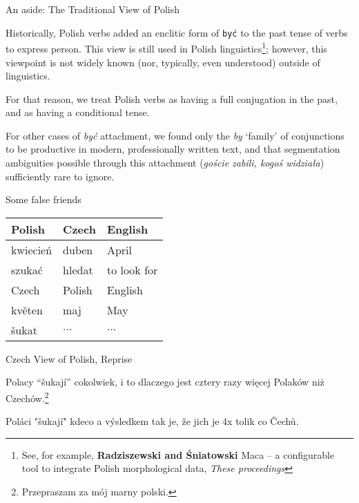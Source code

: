 \documentclass{beamer}
\begin{document}
\begin{frame}{An aside: The Traditional View of Polish}

Historically, Polish verbs added an enclitic form of {\tt by\'{c}} 
to the past tense of verbs to express person. This view is still
used in Polish linguistics\footnote{See, for example, \textbf{Radziszewski and \'{S}niatowski} 
Maca -- a configurable tool to integrate Polish morphological data, \textit{These proceedings}}; 
however, this viewpoint is not widely known (nor, typically, even understood) outside of linguistics.

For that reason, we treat Polish verbs as having a full conjugation in
the past, and as having a conditional tense. 

For other cases of {\it by\'{c}} attachment, we found only the {\it by} `family'
of conjunctions to be productive in modern, professionally written text, and 
that segmentation ambiguities possible through this attachment ({\it goście zabili, kogoś widziała}) 
sufficiently rare to ignore.

\end{frame}

\begin{frame}{Some false friends}
\begin{center}
    \begin{tabular}{ | l | l | l |}
    \hline
     Polish & Czech & English \\ 
     \hline
     kwiecie\'{n} & duben & April \\
     szuka\'{c} & hledat & to look for \\    
     \hline
     Czech & Polish & English \\ 
     \hline
     květen & maj & May \\
     \v{s}ukat & $\dots$ & $\dots$ \\
    \hline
    \end{tabular}
\end{center}
\end{frame}

\begin{frame}{Czech View of Polish, Reprise}

Polacy ``šukají'' cokolwiek, i to dlaczego jest cztery razy więcej Polaków
niż Czechów.\footnote{Przepraszam za mój marny polski.}

{\footnotesize Poláci "šukají" kdeco a výsledkem tak je, že jich je 4x tolik co Čechů.}
\end{frame}
\end{document}

